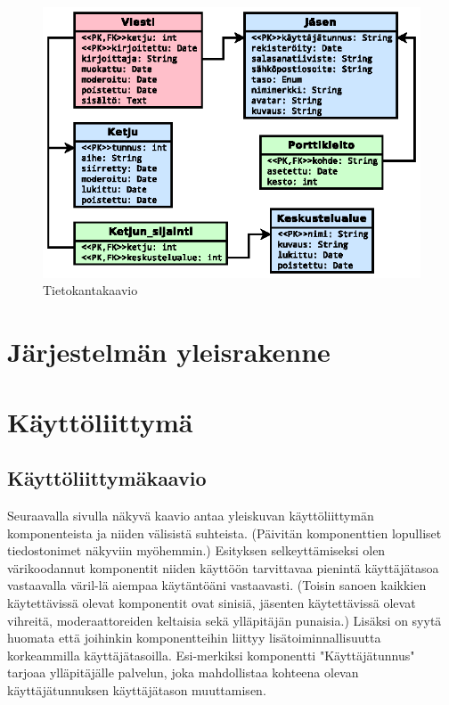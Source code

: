 \documentclass[11pt]{article}
\begin{document}
		\newpage
		\thispagestyle{plain}
		\begin{figure}[H]		
			\includegraphics[trim = 0mm 0mm 0mm 20mm, scale = 1.5]{uml-tietokantakaavio.eps}
			\caption{Tietokantakaavio}
		\end{figure}
		
\newpage
\thispagestyle{plain}
	\section{Järjestelmän yleisrakenne}
	
\newpage
\thispagestyle{plain}
	\section{Käyttöliittymä}
		\subsection{Käyttöliittymäkaavio} Seuraavalla sivulla näkyvä kaavio antaa yleiskuvan käyttöliittymän
		komponenteista ja niiden välisistä suhteista. (Päivitän komponenttien lopulliset tiedostonimet näkyviin
		myöhemmin.) Esityksen selkeyttämiseksi olen värikoodannut komponentit niiden käyttöön tarvittavaa
		pienintä käyttäjätasoa vastaavalla väril-lä aiempaa käytäntöäni vastaavasti. (Toisin sanoen kaikkien
		käytettävissä olevat komponentit ovat sinisiä, jäsenten käytettävissä olevat vihreitä, moderaattoreiden
		keltaisia sekä ylläpitäjän punaisia.) Lisäksi on syytä huomata että joihinkin komponentteihin liittyy
		lisätoiminnallisuutta korkeammilla käyttäjätasoilla. Esi-merkiksi komponentti "Käyttäjätunnus" tarjoaa
		ylläpitäjälle palvelun, joka mahdollistaa kohteena olevan käyttäjätunnuksen käyttäjätason muuttamisen.
		
\end{document}
